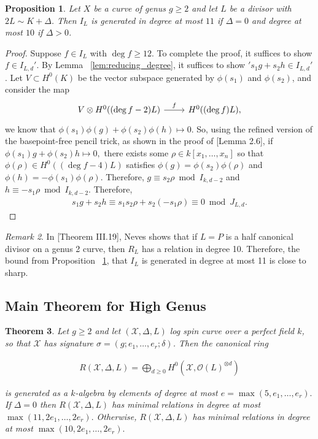\documentclass{amsart}
\theoremstyle{plain}
\newtheorem{thm}{Theorem}[section]
\newtheorem{prop}[thm]{Proposition}
\theoremstyle{definition}
\theoremstyle{remark}
\newtheorem{rem}[thm]{Remark}
\numberwithin{equation}{section}
\newcommand\ssec{\subsection}
\newcommand \sx{\mathscr X}
\newcommand\sco{{\mathscr O}}
\newcommand \halfcan{L}
\begin{document}
\begin{prop}
\label{prop:relation_11}
Let $X$ be a curve of genus $g \geq 2$ and let $L$ be a divisor with $2L \sim K + \Delta$. Then $I_L$ is generated in degree at most $11$ if $\Delta = 0$ and degree at most $10$ if $\Delta > 0$.
\end{prop}
\begin{proof}
Suppose $f \in I_L$ with $\deg f \geq 12$. To complete the proof, it suffices to show $f \in I_{L,d}'$. By Lemma ~\ref{lem:reducing_degree}, it suffices to show $'s_1g+s_2h \in I_{L,d}'$. 
Let $V \subset H^0(K)$ be the vector subspace generated by $\phi(s_1)$ and $\phi(s_2)$, and consider the map
$$\begin{tikzcd}
V \otimes H^0((\deg f - 2)L) \ar {r}{f} & H^0((\deg f)L),
\end{tikzcd}$$
we know that $\phi(s_1)\phi(g) + \phi(s_2) \phi(h) \mapsto 0.$
So, using the refined version of the basepoint-free pencil trick, as shown in the proof of \cite{saint-donat:proj}[Lemma 2.6], if $\phi(s_1) g + \phi(s_2)h \mapsto 0,$ there exists some $\rho \in k[x_1, \ldots, x_n]$ so that $\phi(\rho) \in H^0((\deg f - 4)L)$ satisfies $\phi(g) = \phi(s_2)\phi(\rho)$ and $\phi(h) = -\phi(s_1)\phi(\rho).$ Therefore, $g \equiv s_2 \rho \bmod I_{k,d-2}$ and $h \equiv -s_1 \rho \bmod I_{k,d-2}$. Therefore,
\begin{align*}
	s_1g + s_2h \equiv s_1s_2\rho + s_2(-s_1 \rho) \equiv 0 \bmod J_{L,d}.
\end{align*}
\end{proof}

\begin{rem}
\label{rem:relations_generation_ten}
In \cite{neves:halfcan}[Theorem III.19], Neves shows that if $L=P$ is a half canonical divisor on a genus 2 curve, then $R_L$ has a relation in degree 10. Therefore, the bound from Proposition ~\ref{prop:relation_11}, that $I_L$ is generated in degree at most 11 is close to sharp.
\end{rem}



\ssec{Main Theorem for High Genus}
\label{ssec:main_g_high}

\begin{thm}
\label{thm:high_generators_relations}
Let $g \geq 2$ and let $(\sx, \Delta, \halfcan)$ log spin curve over a perfect field $k$, so
that $\sx$ has signature $\sigma = (g; e_1, \ldots, e_r; \delta)$. Then the
canonical ring

\begin{align*}
	R(\sx, \Delta, \halfcan) = \bigoplus_{d \geq 0} H^0(\sx, \sco(L)^{\otimes d})
\end{align*}

\noindent
is generated as a $k$-algebra by elements of degree at most $e =
\max(5, e_1, \ldots, e_r).$ If $\Delta = 0$ then 
$R(\sx,\Delta, \halfcan)$ has minimal relations in degree at most $\max(11, 2e_1,
\ldots, 2e_r).$ Otherwise, $R(\sx, \Delta, \halfcan)$ has minimal relations in degree at most
$\max(10, 2e_1, \ldots, 2e_r).$
\end{thm}
\end{document}
